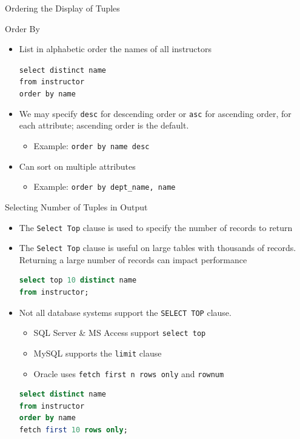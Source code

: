 \documentclass[aspectratio=169, xcolor=dvipsnames]{beamer}
\begin{document}
\begin{frame}{Ordering the Display of Tuples}
    \begin{block}{Order By}
        \begin{itemize}[<+->]
            \item List in alphabetic order the names of all instructors
            \begin{center}
                \texttt{select distinct name \\
                        from instructor \\
                        order by name}
            \end{center}
            \item We may specify \texttt{desc} for descending order or \texttt{asc} for ascending order, for each attribute; ascending order is the default.
            \begin{itemize}
                \item[$\triangleright$] Example: \texttt{order by name desc}
            \end{itemize}
            \item Can sort on multiple attributes
            \begin{itemize}
                \item[$\triangleright$] Example: \texttt{order by dept\_name, name}
            \end{itemize}
        \end{itemize}
    \end{block}
\end{frame}

\begin{frame}[fragile]{Selecting Number of Tuples in Output}
    \begin{itemize}
        \item The \texttt{Select Top} clause is used to specify the number of records to return
        \item The \texttt{Select Top} clause is useful on large tables with thousands of records. Returning a large number of records can impact performance
        \begin{lstlisting}[language=SQL]
select top 10 distinct name 
from instructor;
        \end{lstlisting}
        \item Not all database systems support the \texttt{SELECT TOP} clause.
        \begin{itemize}
            \item SQL Server \& MS Access support \texttt{select top}
            \item MySQL supports the \texttt{limit} clause
            \item Oracle uses \texttt{fetch first n rows only} and \texttt{rownum}
        \end{itemize}
        \begin{lstlisting}[language=SQL]
select distinct name 
from instructor 
order by name 
fetch first 10 rows only;
        \end{lstlisting}
    \end{itemize}
\end{frame}
\end{document}
